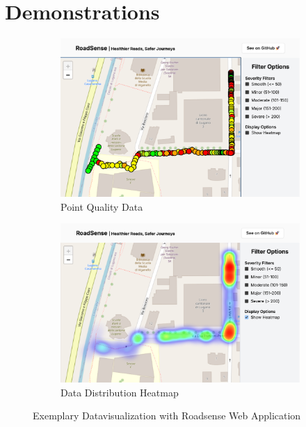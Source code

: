 \section{Demonstrations}

\begin{figure}[ht!]
    \centering
    \begin{subfigure}[b]{0.49\textwidth}
        \centering
        \includegraphics[width=\textwidth]{../../assets/images/roadsense_webapp_points.png}
        \caption{Point Quality Data}
    \end{subfigure}
    \hfill
    \begin{subfigure}[b]{0.49\textwidth}
        \centering
        \includegraphics[width=\textwidth]{../../assets/images/roadsense_webapp_heat.png}
        \caption{Data Distribution Heatmap} 
    \end{subfigure}

       \caption{Exemplary Datavisualization with Roadsense Web Application}
       \label{fig:lreg_eda_plots}
\end{figure}